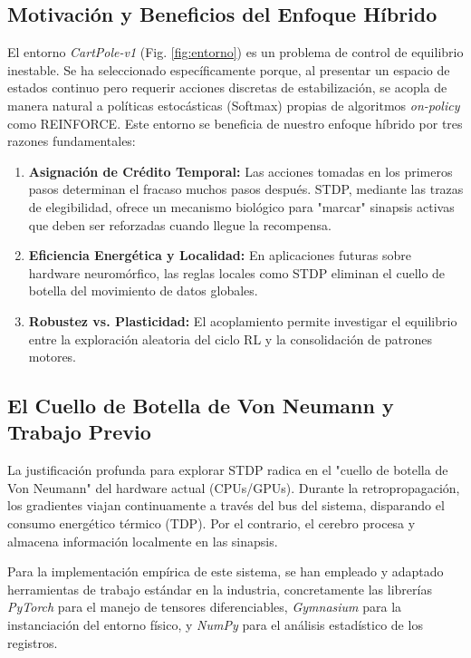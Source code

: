 \documentclass[conference, 10pt]{IEEEtran}
\begin{document}
\subsection{Motivación y Beneficios del Enfoque Híbrido}
El entorno \textit{CartPole-v1} (Fig. \ref{fig:entorno}) es un problema de control de equilibrio inestable. Se ha seleccionado específicamente porque, al presentar un espacio de estados continuo pero requerir acciones discretas de estabilización, se acopla de manera natural a políticas estocásticas (Softmax) propias de algoritmos \textit{on-policy} como REINFORCE. Este entorno se beneficia de nuestro enfoque híbrido por tres razones fundamentales:
\begin{enumerate}
    \item \textbf{Asignación de Crédito Temporal:} Las acciones tomadas en los primeros pasos determinan el fracaso muchos pasos después. STDP, mediante las trazas de elegibilidad, ofrece un mecanismo biológico para "marcar" sinapsis activas que deben ser reforzadas cuando llegue la recompensa.
    \item \textbf{Eficiencia Energética y Localidad:} En aplicaciones futuras sobre hardware neuromórfico, las reglas locales como STDP eliminan el cuello de botella del movimiento de datos globales.
    \item \textbf{Robustez vs. Plasticidad:} El acoplamiento permite investigar el equilibrio entre la exploración aleatoria del ciclo RL y la consolidación de patrones motores.
\end{enumerate}

\subsection{El Cuello de Botella de Von Neumann y Trabajo Previo}
La justificación profunda para explorar STDP radica en el "cuello de botella de Von Neumann" del hardware actual (CPUs/GPUs). Durante la retropropagación, los gradientes viajan continuamente a través del bus del sistema, disparando el consumo energético térmico (TDP). Por el contrario, el cerebro procesa y almacena información localmente en las sinapsis. 

Para la implementación empírica de este sistema, se han empleado y adaptado herramientas de trabajo estándar en la industria, concretamente las librerías \textit{PyTorch} \cite{pytorch} para el manejo de tensores diferenciables, \textit{Gymnasium} \cite{gymnasium} para la instanciación del entorno físico, y \textit{NumPy} \cite{numpy} para el análisis estadístico de los registros.
\end{document}
